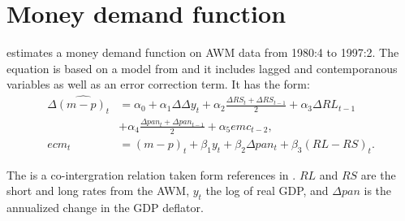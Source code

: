 \documentclass[11pt,oneside, a4paper]{amsart}\usepackage[]{graphicx}\usepackage[]{color}
\begin{document}
\clearpage
\newpage

\section{Money demand function}

\cite{baardsen2005econometrics} estimates a money demand function on AWM data from 1980:4 to 1997:2. The equation is based on a model from \cite{coenen2001demand} and it includes lagged and contemporanous variables as well as an error correction term. It has the form:
\begin{align*}
\Delta \widehat{\left(m-p\right)_t} &= \alpha_0 + \alpha_1 \Delta \Delta y_t + \alpha_2 \frac{\Delta RS_t + \Delta RS_{t-1}}{2} 
+ \alpha_3 \Delta RL_{t-1} \\
&+ \alpha_4 \frac{\Delta pan_t + \Delta pan_{t-1}}{2} + \alpha_5 emc_{t-2},\\
ecm_t &= (m-p)_t + \beta_1 y_t + \beta_2 \Delta pan_t + \beta_3 (RL-RS)_t.
\end{align*}

The  is a co-intergration relation taken form references in \cite[p. 152]{baardsen2005econometrics}. $RL$ and $RS$ are the short and long rates from the AWM, $y_t$ the log of real GDP, and $\Delta pan$ is the annualized change in the GDP deflator.  
\end{document}
